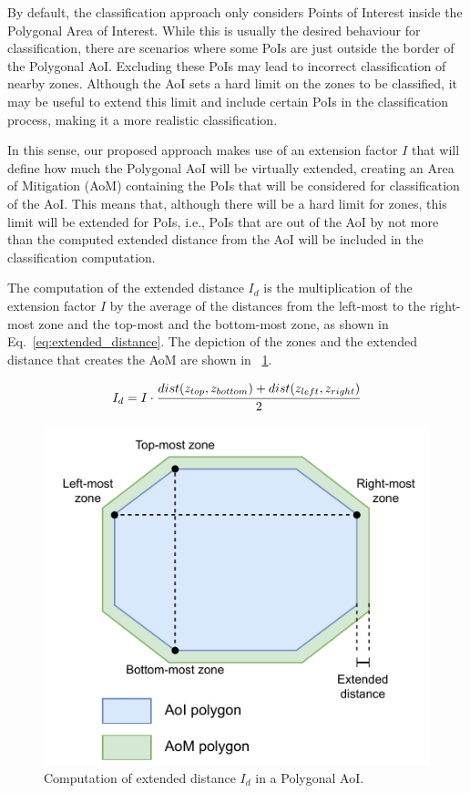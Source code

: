 \begin{refsection}

By default, the classification approach only considers Points of Interest inside the Polygonal Area of Interest. While this is usually the desired behaviour for classification, there are scenarios where some PoIs are just outside the border of the Polygonal AoI. Excluding these PoIs may lead to incorrect classification of nearby zones. Although the AoI sets a hard limit on the zones to be classified, it may be useful to extend this limit and include certain PoIs in the classification process, making it a more realistic classification.%

In this sense, our proposed approach makes use of an extension factor $I$ that will define how much the Polygonal AoI will be virtually extended, creating an Area of Mitigation (AoM) containing the PoIs that will be considered for classification of the AoI. This means that, although there will be a hard limit for zones, this limit will be extended for PoIs, i.e., PoIs that are out of the AoI by not more than the computed extended distance from the AoI will be included in the classification computation.

The computation of the extended distance $I_d$ is the multiplication of the extension factor $I$ by the average of the distances from the left-most to the right-most zone and the top-most and the bottom-most zone, as shown in Eq.~\ref{eq:extended_distance}. The depiction of the zones and the extended distance that creates the AoM are shown in \figurename~\ref{fig:extension_factor}.

\begin{equation}
  \label{eq:extended_distance}
  I_d = I \cdot \cfrac{dist(z_{top}, z_{bottom}) + dist(z_{left}, z_{right})}{2}
\end{equation}

\begin{figure}[!ht]
  \centering
  \includegraphics[width=0.7\linewidth]{Chapters/5-AoM/img/extension_factor.pdf}
  \caption{Computation of extended distance $I_d$ in a Polygonal AoI.}\label{fig:extension_factor}
\end{figure}


\end{refsection}
